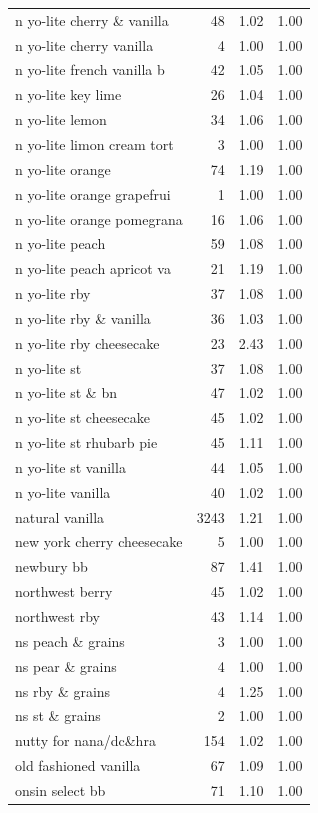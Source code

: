 \begin{table}
\begin{tabular}{lrrr}
n yo-lite cherry \& vanilla & 48 & 1.02 & 1.00 \\
n yo-lite cherry vanilla & 4 & 1.00 & 1.00 \\
n yo-lite french vanilla b & 42 & 1.05 & 1.00 \\
n yo-lite key lime & 26 & 1.04 & 1.00 \\
n yo-lite lemon & 34 & 1.06 & 1.00 \\
n yo-lite limon cream tort & 3 & 1.00 & 1.00 \\
n yo-lite orange & 74 & 1.19 & 1.00 \\
n yo-lite orange grapefrui & 1 & 1.00 & 1.00 \\
n yo-lite orange pomegrana & 16 & 1.06 & 1.00 \\
n yo-lite peach & 59 & 1.08 & 1.00 \\
n yo-lite peach apricot va & 21 & 1.19 & 1.00 \\
n yo-lite rby & 37 & 1.08 & 1.00 \\
n yo-lite rby \& vanilla & 36 & 1.03 & 1.00 \\
n yo-lite rby cheesecake & 23 & 2.43 & 1.00 \\
n yo-lite st & 37 & 1.08 & 1.00 \\
n yo-lite st \& bn & 47 & 1.02 & 1.00 \\
n yo-lite st cheesecake & 45 & 1.02 & 1.00 \\
n yo-lite st rhubarb pie & 45 & 1.11 & 1.00 \\
n yo-lite st vanilla & 44 & 1.05 & 1.00 \\
n yo-lite vanilla & 40 & 1.02 & 1.00 \\
natural vanilla & 3243 & 1.21 & 1.00 \\
new york cherry cheesecake & 5 & 1.00 & 1.00 \\
newbury bb & 87 & 1.41 & 1.00 \\
northwest berry & 45 & 1.02 & 1.00 \\
northwest rby & 43 & 1.14 & 1.00 \\
ns peach \& grains & 3 & 1.00 & 1.00 \\
ns pear \& grains & 4 & 1.00 & 1.00 \\
ns rby \& grains & 4 & 1.25 & 1.00 \\
ns st \& grains & 2 & 1.00 & 1.00 \\
nutty for nana/dc\&hra & 154 & 1.02 & 1.00 \\
old fashioned vanilla & 67 & 1.09 & 1.00 \\
onsin select bb & 71 & 1.10 & 1.00 \\

\end{tabular}
\end{table}
